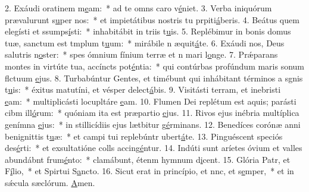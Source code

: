 2. Exáudi oratinem m\uline{e}am:~* ad te omns caro v\uline{é}niet.
3. Verba iniquórum prævalurunt s\uline{u}per nos:~* et impietátibus nostris tu prpiti\uline{á}beris.
4. Beátus quem elegísti et ssumps\uline{í}sti:~* inhabitábit in triis t\uline{u}is.
5. Replébimur in bonis domus tuæ, sanctum est tmplum t\uline{u}um:~* mirábile n æquit\uline{á}te.
6. Exáudi nos, Deus salutris n\uline{o}ster:~* spes ómnium fínium terræ et n mari l\uline{o}nge.
7. Prǽparans montes in virtúte tua, accíncts pot\uline{é}ntia:~* qui contúrbas profúndum maris sonum flctuum \uline{e}jus.
8. Turbabúntur Gentes, et timébunt qui inhábitant términos a sgnis t\uline{u}is:~* éxitus matutíni, et vésper delect\uline{á}bis.
9. Visitásti terram, et inebristi \uline{e}am:~* multiplicásti locupltáre \uline{e}am.
10. Flumen Dei replétum est aquis; parásti cibm ill\uline{ó}rum:~* quóniam ita est præpartio \uline{e}jus.
11. Rivos ejus inébria multíplica genímna \uline{e}jus:~* in stillicídiis ejus lætbitur g\uline{é}rminans.
12. Benedíces corónæ anni benignittis t\uline{u}æ:~* et campi tui replebúntr ubert\uline{á}te.
13. Pinguéscent speciós des\uline{é}rti:~* et exsultatióne colls accing\uline{é}ntur.
14. Indúti sunt aríetes óvium et valles abundábnt frum\uline{é}nto:~* clamábunt, étenm hymnum d\uline{i}cent.
15. Glória Patr, et F\uline{í}lio,~* et Spirtui S\uline{a}ncto.
16. Sicut erat in princípio, et nnc, et s\uline{e}mper,~* et in sǽcula sæclórum. \uline{A}men.
